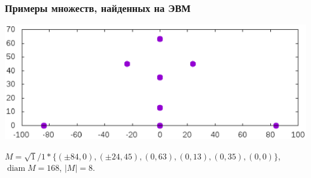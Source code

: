 \documentclass[10pt,pdf,hyperref={unicode}]{beamer}
\theoremstyle{definition}
\begin{document}
\begin{frame}
	\frametitle{Примеры множеств, найденных на ЭВМ~\cite{our-pmm-2018}}

	\center
	\includegraphics[width=\linewidth,trim={0 50 0 50},clip=true]{Avdeev_8_168_1538490487450.eps}


	$
	M=
	\sqrt{1}/1 *
	\{
	( \pm84 , 0),
	( \pm24 , 45),
	( 0 , 63),
	( 0 , 13),
	( 0 , 35),
	( 0 , 0)
	\}
	$,
	\\
	$\operatorname{diam} M = 168$,
	$|M| = 8$.


\end{frame}



%
%
%
%
\end{document}
